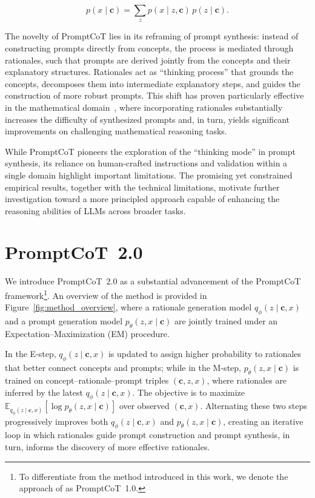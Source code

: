 \begin{equation}
\label{eq:marginal_likelihood}
p(x \mid \mathbf{c}) = \sum_{z} p(x \mid z, \mathbf{c})\, p(z \mid \mathbf{c}).
\end{equation}


The novelty of PromptCoT lies in its reframing of prompt synthesis: instead of constructing prompts directly from concepts, the process is mediated through rationales, such that prompts are derived jointly from the concepts and their explanatory structures. Rationales act as ``thinking process'' that grounds the concepts, decomposes them into intermediate explanatory steps, and guides the construction of more robust prompts. This shift has proven particularly effective in the mathematical domain~\citep{zhao2025promptcot}, where incorporating rationales substantially increases the difficulty of synthesized prompts and, in turn, yields significant improvements on challenging mathematical reasoning tasks.

While PromptCoT pioneers the exploration of the ``thinking mode'' in prompt synthesis, its reliance on human-crafted instructions and validation within a single domain highlight important limitations. The promising yet constrained empirical results, together with the technical limitations, motivate further investigation toward a more principled approach capable of enhancing the reasoning abilities of LLMs across broader tasks.


\section{PromptCoT~2.0}
We introduce PromptCoT~2.0 as a substantial advancement of the PromptCoT framework\footnote{To differentiate from the method introduced in this work, we denote the approach of \citep{zhao2025promptcot} as PromptCoT~1.0.}. An overview of the method is provided in Figure~\ref{fig:method_overview}, where a rationale generation model $q_\phi(z \mid \mathbf{c}, x)$ and a prompt generation model $p_\theta(z, x \mid \mathbf{c})$ are jointly trained under an Expectation–Maximization (EM) procedure.

In the E-step, $q_\phi(z \mid \mathbf{c}, x)$ is updated to assign higher probability to rationales that better connect concepts and prompts; while in the M-step, $p_\theta(z, x \mid \mathbf{c})$ is trained on concept–rationale–prompt triples $(\mathbf{c}, z, x)$, where rationales are inferred by the latest $q_\phi(z \mid \mathbf{c}, x)$. The objective is to maximize $\mathbb{E}_{q_\phi(z \mid \mathbf{c}, x)}[\log p_\theta(z, x \mid \mathbf{c})]$ over observed $(\mathbf{c}, x)$. Alternating these two steps progressively improves both $q_\phi(z \mid \mathbf{c}, x)$ and $p_\theta(z, x \mid \mathbf{c})$, creating an iterative loop in which rationales guide prompt construction and prompt synthesis, in turn, informs the discovery of more effective rationales.







